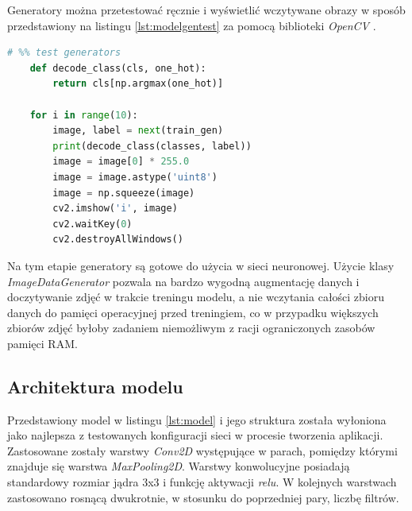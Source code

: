 \documentclass[a4paper,12pt,oneside]{book} %
\begin{document}
Generatory można przetestować ręcznie i wyświetlić wczytywane obrazy w sposób przedstawiony na listingu \ref{lst:modelgentest} za pomocą biblioteki \emph{OpenCV} \cite{opencv}.

\begin{lstlisting}[language=Python, caption={Wczytanie i wyświetlenie pierwszych 10 zdjęć za pomocą ImageDataGenerator}, label={lst:modelgentest}]
	# %% test generators
	def decode_class(cls, one_hot):
		return cls[np.argmax(one_hot)]
		
	for i in range(10):
		image, label = next(train_gen)
		print(decode_class(classes, label))
		image = image[0] * 255.0
		image = image.astype('uint8')
		image = np.squeeze(image)
		cv2.imshow('i', image)
		cv2.waitKey(0)
		cv2.destroyAllWindows()
\end{lstlisting}

Na tym etapie generatory są gotowe do użycia w sieci neuronowej. Użycie klasy \emph{ImageDataGenerator} pozwala na bardzo wygodną augmentację danych i doczytywanie zdjęć w trakcie treningu modelu, a nie wczytania całości zbioru danych do pamięci operacyjnej przed treningiem, co w przypadku większych zbiorów zdjęć byłoby zadaniem niemożliwym z racji ograniczonych zasobów pamięci RAM.

\subsection{Architektura modelu}

Przedstawiony model w listingu \ref{lst:model} i jego struktura została wyłoniona jako najlepsza z testowanych konfiguracji sieci w procesie tworzenia aplikacji. Zastosowane zostały warstwy \emph{Conv2D} występujące w parach, pomiędzy którymi znajduje się warstwa \emph{MaxPooling2D}. Warstwy konwolucyjne posiadają standardowy rozmiar jądra 3x3 i funkcję aktywacji \emph{relu}. W kolejnych warstwach zastosowano rosnącą dwukrotnie, w stosunku do poprzedniej pary, liczbę filtrów.
\end{document}
